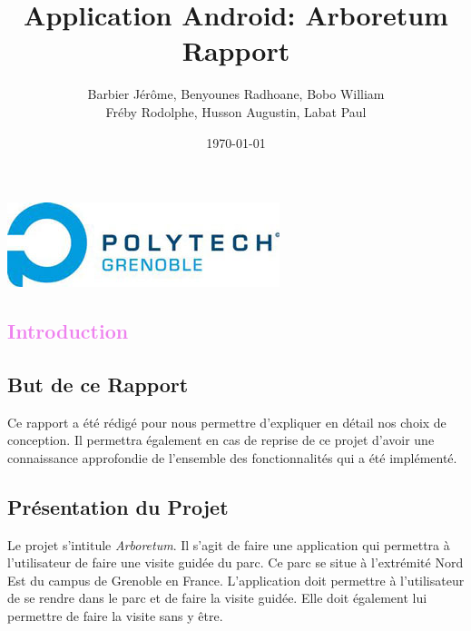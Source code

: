 \documentclass[a4paper,11pt]{article}
\title{Application Android: Arboretum\\
Rapport}
\author{Barbier Jérôme, Benyounes Radhoane, Bobo William\\ Fréby Rodolphe, Husson Augustin, Labat Paul}
\date{\today}
\begin{document}
   \maketitle

  \begin{center}
    \includegraphics{logoPol.jpg}\\
  \end{center}
  \tableofcontents
  \newpage
  
  \textcolor{Violet}{\section{Introduction}}
    \textcolor{NavyBlue}{\subsection{But de ce Rapport}}
  Ce rapport a été rédigé pour nous permettre d'expliquer en détail nos choix de conception. Il permettra également en cas de reprise de ce projet 
  d'avoir une connaissance approfondie de l'ensemble des fonctionnalités qui a été implémenté.
  
    \textcolor{NavyBlue}{\subsection{Présentation du Projet}}
    Le projet s'intitule \textit{Arboretum}. Il s'agit de faire une application qui permettra à l'utilisateur de faire une visite guidée du parc.
    Ce parc se situe à l'extrémité Nord Est du campus de Grenoble en France. L'application doit permettre à l'utilisateur de se rendre dans le parc
    et de faire la visite guidée. Elle doit également lui permettre de faire la visite sans y être. 
    
\end{document}
